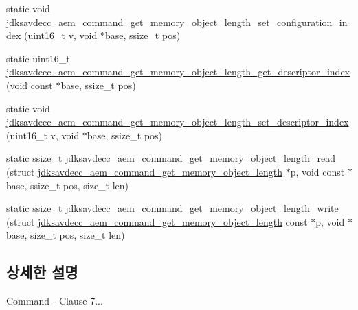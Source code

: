 \begin{DoxyCompactItemize}
static void \hyperlink{group__command__get__memory__object__length_ga29c361b4027cc3e297ccd0410835e75b}{jdksavdecc\+\_\+aem\+\_\+command\+\_\+get\+\_\+memory\+\_\+object\+\_\+length\+\_\+set\+\_\+configuration\+\_\+index} (uint16\+\_\+t v, void $\ast$base, ssize\+\_\+t pos)
\item 
static uint16\+\_\+t \hyperlink{group__command__get__memory__object__length_ga91ac697db77b7a0ce5a223a9e879a5a4}{jdksavdecc\+\_\+aem\+\_\+command\+\_\+get\+\_\+memory\+\_\+object\+\_\+length\+\_\+get\+\_\+descriptor\+\_\+index} (void const $\ast$base, ssize\+\_\+t pos)
\item 
static void \hyperlink{group__command__get__memory__object__length_ga856c1b899d53f8e117c1d25266e6c3ae}{jdksavdecc\+\_\+aem\+\_\+command\+\_\+get\+\_\+memory\+\_\+object\+\_\+length\+\_\+set\+\_\+descriptor\+\_\+index} (uint16\+\_\+t v, void $\ast$base, ssize\+\_\+t pos)
\item 
static ssize\+\_\+t \hyperlink{group__command__get__memory__object__length_ga9a8f725287029f2ef559ce8ba7fc5965}{jdksavdecc\+\_\+aem\+\_\+command\+\_\+get\+\_\+memory\+\_\+object\+\_\+length\+\_\+read} (struct \hyperlink{structjdksavdecc__aem__command__get__memory__object__length}{jdksavdecc\+\_\+aem\+\_\+command\+\_\+get\+\_\+memory\+\_\+object\+\_\+length} $\ast$p, void const $\ast$base, ssize\+\_\+t pos, size\+\_\+t len)
\item 
static ssize\+\_\+t \hyperlink{group__command__get__memory__object__length_ga1118e1b9b0f1ad906e2d8621ace68778}{jdksavdecc\+\_\+aem\+\_\+command\+\_\+get\+\_\+memory\+\_\+object\+\_\+length\+\_\+write} (struct \hyperlink{structjdksavdecc__aem__command__get__memory__object__length}{jdksavdecc\+\_\+aem\+\_\+command\+\_\+get\+\_\+memory\+\_\+object\+\_\+length} const $\ast$p, void $\ast$base, size\+\_\+t pos, size\+\_\+t len)
\end{DoxyCompactItemize}


\subsection{상세한 설명}
Command -\/ Clause 7... 

